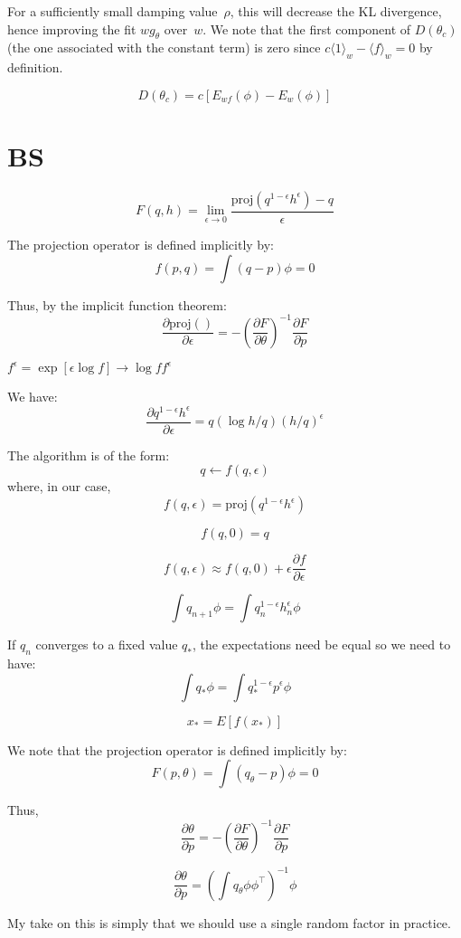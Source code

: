 \documentclass{article}
\begin{document}
For a sufficiently small damping value~$\rho$, this will decrease the KL divergence, hence improving the fit $wg_\theta$ over~$w$. We note that the first component of $D(\theta_c)$ (the one associated with the constant term) is zero since $c\langle 1 \rangle_w - \langle f \rangle_w = 0$ by definition. 

$$
D(\theta_c) = c [E_{wf}(\phi) - E_{w}(\phi)]
$$


\section{BS}

$$
F(q,h) = \lim_{\epsilon\to 0} 
\frac{\text{proj}(q^{1-\epsilon}h^\epsilon)-q}{\epsilon}
$$

The projection operator is defined implicitly by:
$$
f(p,q) = \int (q-p) \phi = 0
$$

Thus, by the implicit function theorem:
$$
\frac{\partial \text{proj}()}{\partial \epsilon}
= - \left(\frac{\partial F}{\partial \theta}\right)^{-1} \frac{\partial F}{\partial p}
$$

$
f^{\epsilon}= \exp [\epsilon\log f]
\to \log f f^{\epsilon}$

We have:
$$
\frac{\partial q^{1-\epsilon}h^\epsilon}{\partial \epsilon}
=
q (\log h/q) (h/q)^\epsilon
$$


The algorithm is of the form:
$$
q \leftarrow f(q, \epsilon)
$$
where, in our case,
$$
f(q,\epsilon) = \text{proj}(q^{1-\epsilon} h^\epsilon)
$$

$$
f(q,0) = q
$$

$$
f(q,\epsilon) \approx f(q,0) + \epsilon \frac{\partial f}{\partial \epsilon}
$$

$$
\int q_{n+1} \phi = \int q_n^{1-\epsilon} h_n^\epsilon \phi
$$

If $q_n$ converges to a fixed value $q_*$, the expectations need be equal so we need to have: 
$$
\int q_*\phi = \int q_*^{1-\epsilon}p^\epsilon \phi
$$


$$
x_* = E[f(x_*)] 
$$

We note that the projection operator is defined implicitly by:
$$
F(p,\theta) = \int (q_\theta-p)\phi = 0
$$

Thus, 
$$
\frac{\partial \theta}{\partial p}
= - \left(\frac{\partial F}{\partial \theta}\right)^{-1} \frac{\partial F}{\partial p}
$$

$$
\frac{\partial \theta}{\partial p} = \left(\int q_\theta \phi\phi^\top \right)^{-1} \phi
$$


My take on this is simply that we should use a single random factor in practice. 
\end{document}
